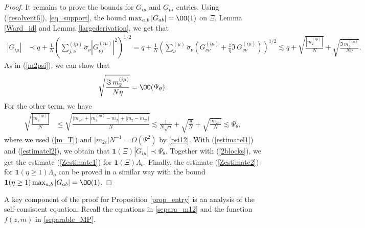 \begin{proof}
It remains to prove the bounds for $G_{i\mu}$ and $G_{\mu i}$ entries. Using (\ref{resolvent6}), \eqref{eq_support}, %
the bound $\max_{a,b}|G_{ab}|= \OO(1)$ on $\Xi$, Lemma \ref{Ward_id} and Lemma \ref{largederivation}, we get that %
\begin{equation*}%
\begin{split}
\left|G_{i\mu }\right| & \prec q+  \frac{1}{N}\left( {\sum^{(i\mu)}_{j,\nu } \tilde \sigma_\nu {\left| {G_{\nu j}^{(i\mu)} } \right|^2 } } \right)^{1/2}= q+  \frac{1}{N}\left( \sum_{\nu}^{(\mu)}\tilde \sigma_\nu \left({G}^{(i\mu)}_{\nu \nu}  + \frac{\bar z}{\eta} \Im \, G_{\nu\nu}^{(i\mu)}\right)\right)^{1/2} \lesssim q+\sqrt{ \frac{|m_2^{(i\mu)}|}{N} } + \sqrt{\frac{ \Im \, m_2^{(i\mu)}}{N\eta}} .
\end{split}
\end{equation*}
As in (\ref{m2psi}), we can show that
\begin{equation}\label{estimatel1} \sqrt{\frac{ \Im \, m_2^{(i\mu)}}{N\eta}}= \OO(\Psi_\theta).\end{equation}
For the other term, we have
\begin{equation}\label{estimatel2}
\begin{split}
  \sqrt{ \frac{|m_2^{(i\mu)}|}{N} } & \le  \sqrt {\frac{|m_{2c}|  + |m_2^{(i\mu)}  - m_2| + |m_2  - m_{2c} |}{{N}}} \lesssim \frac{1}{N\sqrt{\eta}}+\sqrt { \frac{\theta }{{N}}}  + \sqrt {\frac{{\left| {m_{2c} } \right|}}{N}}   \lesssim  \Psi _\theta , 
 \end{split}
\end{equation}
where we used (\ref{m_T}) and ${{\left| {m_{2c} } \right|}}{{N}^{-1}} = O(\Psi^2) $ by \eqref{psi12}. %
With (\ref{estimatel1}) and (\ref{estimatel2}), we obtain that ${\mathbf 1}(\Xi) |G_{i\mu}| \prec \Psi_\theta $. Together with (\ref{2blocks}), we get the estimate (\ref{Zestimate1}) for $\mathbf 1(\Xi)\Lambda_o$. Finally, the estimate (\ref{Zestimate2}) for ${\mathbf 1}\left(\eta \ge 1 \right)\Lambda_o$ can be proved in a similar way with the bound $\mathbf{1}(\eta\ge 1)\max_{a,b}|G_{ab}|= \OO(1)$.
\end{proof}

A key component of the proof for Proposition \ref{prop_entry} is an analysis of the self-consistent equation. Recall the equations in \eqref{separa_m12} and the function $f(z,m)$ in \eqref{separable_MP}.

